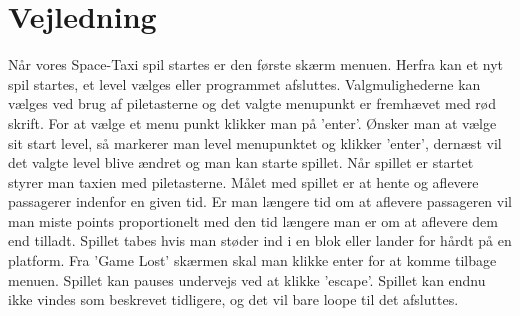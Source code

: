 \section{Vejledning}
Når vores Space-Taxi spil startes er den første skærm menuen. Herfra kan et nyt spil startes, et level vælges eller programmet afsluttes. Valgmulighederne kan vælges ved brug af piletasterne og det valgte menupunkt er fremhævet med rød skrift. For at vælge et menu punkt klikker man på 'enter'. Ønsker man at vælge sit start level, så markerer man level menupunktet og klikker 'enter', dernæst vil det valgte level blive ændret og man kan starte spillet. Når spillet er startet styrer man taxien med piletasterne. Målet med spillet er at hente og aflevere passagerer indenfor en given tid. Er man længere tid om at aflevere passageren vil man miste points proportionelt med den tid længere man er om at aflevere dem end tilladt. Spillet tabes hvis man støder ind i en blok eller lander for hårdt på en platform. Fra 'Game Lost' skærmen skal man klikke enter for at komme tilbage menuen. Spillet kan pauses undervejs ved at klikke 'escape'. Spillet kan endnu ikke vindes som beskrevet tidligere, og det vil bare loope til det afsluttes. 